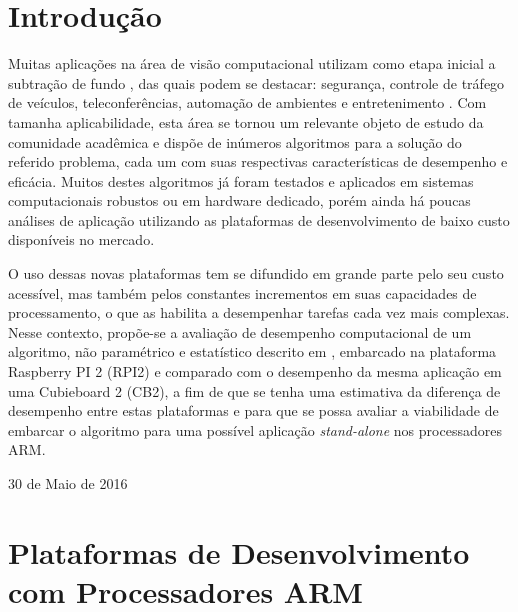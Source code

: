 \documentclass[conference]{IEEEtran}
\begin{document}




%
\IEEEpeerreviewmaketitle



\section{Introdução}
Muitas aplicações na área de visão computacional utilizam como etapa inicial a subtração de fundo \cite{IEEEhowto:sobral}, das quais podem se destacar: segurança, controle de tráfego de veículos, teleconferências, automação de ambientes e entretenimento \cite{IEEEhowto:parolin}. Com tamanha aplicabilidade, esta área se tornou um relevante objeto de estudo da comunidade acadêmica e dispõe de inúmeros algoritmos para a solução do referido problema, cada um com suas respectivas características de desempenho e eficácia. Muitos destes algoritmos já foram testados e aplicados em sistemas computacionais robustos ou em hardware dedicado\cite{IEEEhowto:oliveira}, porém ainda há poucas análises de aplicação utilizando as plataformas de desenvolvimento de baixo custo disponíveis no mercado.

O uso dessas novas plataformas tem se difundido em grande parte pelo seu custo acessível, mas também pelos constantes incrementos em suas capacidades de processamento, o que as habilita a desempenhar tarefas cada vez mais complexas. Nesse contexto, propõe-se a avaliação de desempenho computacional de um algoritmo, não paramétrico e estatístico descrito em \cite{IEEEhowto:horprasert}, embarcado na plataforma Raspberry PI 2 (RPI2) e comparado com o desempenho da mesma aplicação em uma Cubieboard 2 (CB2), a fim de que se tenha uma estimativa da diferença de desempenho entre estas plataformas e para que se possa avaliar a viabilidade de embarcar o algoritmo para uma possível aplicação \textit{stand-alone} nos processadores ARM.

\hfill 30 de Maio de 2016


\section{Plataformas de Desenvolvimento com Processadores ARM}
\end{document}
